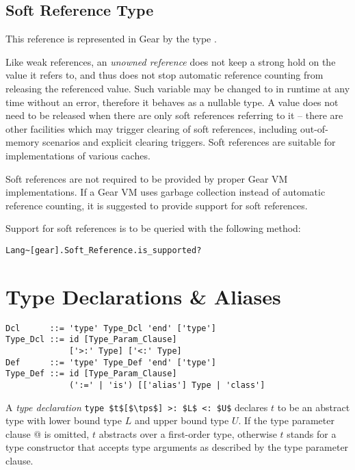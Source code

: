 \subsection{Soft Reference Type}

This reference is represented in Gear by the type . 

Like weak references, an {\em unowned reference} does not keep a strong hold on the value it refers to, and thus does not stop automatic reference counting from releasing the referenced value. Such variable may be changed to  in runtime at any time without an error, therefore it behaves as a nullable type. A value does not need to be released when there are only soft references referring to it -- there are other facilities which may trigger clearing of soft references, including out-of-memory scenarios and explicit clearing triggers. Soft references are suitable for implementations of various caches. 

Soft references are not required to be provided by proper Gear VM implementations. If a Gear VM uses garbage collection instead of automatic reference counting, it is suggested to provide support for soft references. 

Support for soft references is to be queried with the following method:
\begin{lstlisting}
Lang~[gear].Soft_Reference.is_supported?
\end{lstlisting}






\section{Type Declarations \& Aliases}
\label{sec:type-decls-aliases}

\syntax\begin{lstlisting}
Dcl      ::= 'type' Type_Dcl 'end' ['type']
Type_Dcl ::= id [Type_Param_Clause] 
             ['>:' Type] ['<:' Type]
Def      ::= 'type' Type_Def 'end' ['type']
Type_Def ::= id [Type_Param_Clause] 
             (':=' | 'is') [['alias'] Type | 'class']
\end{lstlisting}

A {\em type declaration} \lstinline!type $t$[$\tps$] >: $L$ <: $U$! declares $t$ to be an abstract type with lower bound type $L$ and upper bound type $U$. If the type parameter clause \lstinline@[$\tps$]@ is omitted, $t$ abstracts over a first-order type, otherwise $t$ stands for a type constructor that accepts type arguments as described by the type parameter clause. 

